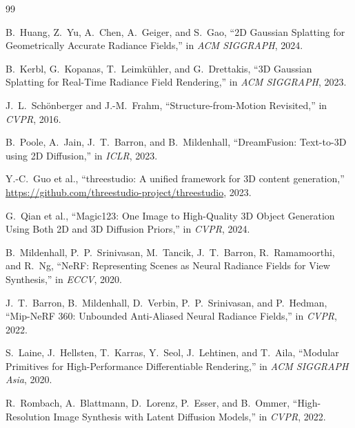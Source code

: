 \documentclass{article}
\begin{document}

\begin{thebibliography}{99}

B.~Huang, Z.~Yu, A.~Chen, A.~Geiger, and S.~Gao,
``2D Gaussian Splatting for Geometrically Accurate Radiance Fields,''
in \emph{ACM SIGGRAPH}, 2024.

B.~Kerbl, G.~Kopanas, T.~Leimkühler, and G.~Drettakis,
``3D Gaussian Splatting for Real-Time Radiance Field Rendering,''
in \emph{ACM SIGGRAPH}, 2023.

J.~L.~Schönberger and J.-M.~Frahm,
``Structure-from-Motion Revisited,''
in \emph{CVPR}, 2016.

B.~Poole, A.~Jain, J.~T.~Barron, and B.~Mildenhall,
``DreamFusion: Text-to-3D using 2D Diffusion,''
in \emph{ICLR}, 2023.

Y.-C.~Guo et al.,
``threestudio: A unified framework for 3D content generation,''
\url{https://github.com/threestudio-project/threestudio}, 2023.

G.~Qian et al.,
``Magic123: One Image to High-Quality 3D Object Generation Using Both 2D and 3D
Diffusion Priors,''
in \emph{CVPR}, 2024.

B.~Mildenhall, P.~P.~Srinivasan, M.~Tancik, J.~T.~Barron, R.~Ramamoorthi, and R.~Ng,
``NeRF: Representing Scenes as Neural Radiance Fields for View Synthesis,''
in \emph{ECCV}, 2020.

J.~T.~Barron, B.~Mildenhall, D.~Verbin, P.~P.~Srinivasan, and P.~Hedman,
``Mip-NeRF 360: Unbounded Anti-Aliased Neural Radiance Fields,''
in \emph{CVPR}, 2022.

S.~Laine, J.~Hellsten, T.~Karras, Y.~Seol, J.~Lehtinen, and T.~Aila,
``Modular Primitives for High-Performance Differentiable Rendering,''
in \emph{ACM SIGGRAPH Asia}, 2020.

R.~Rombach, A.~Blattmann, D.~Lorenz, P.~Esser, and B.~Ommer,
``High-Resolution Image Synthesis with Latent Diffusion Models,''
in \emph{CVPR}, 2022.

\end{thebibliography}
\end{document}
